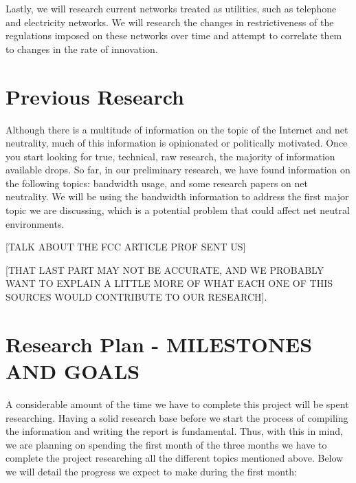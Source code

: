 \documentclass{sigcomm-alternate}
\begin{document}
Lastly, we will research current networks treated as utilities, such as telephone and electricity networks. We will research the changes in restrictiveness of the regulations imposed on these networks over time and attempt to correlate them to changes in the rate of innovation.


\section{Previous Research}
Although there is a multitude of information on the topic of the Internet and net neutrality, much of this information is opinionated or politically motivated. Once you start looking for true, technical, raw research, the majority of information available drops. So far, in our preliminary research, we have found information on the following topics: bandwidth usage, and some research papers on net neutrality. We will be using the bandwidth information to address the first major topic we are discussing, which is a potential problem that could affect net neutral environments. 


[TALK ABOUT THE FCC ARTICLE PROF SENT US]




[THAT LAST PART MAY NOT BE ACCURATE, AND WE PROBABLY WANT TO EXPLAIN A LITTLE MORE OF WHAT EACH ONE OF THIS SOURCES WOULD CONTRIBUTE TO OUR RESEARCH].


\cite{FCCTomWheeler}



\section{Research Plan - MILESTONES AND GOALS}


A considerable amount of the time we have to complete this project will be spent researching. Having a solid research base before we start the process of compiling the information and writing the report is fundamental. Thus, with this in mind, we are planning on spending the first month of the three months we have to complete the project researching all the different topics mentioned above. Below we will detail the progress we expect to make during the first month:
\end{document}
